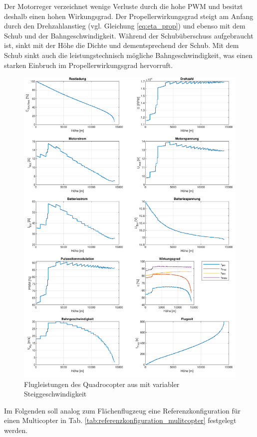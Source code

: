 Der Motorreger verzeichnet wenige Verluste durch die hohe PWM und besitzt deshalb einen hohen Wirkungsgrad. Der Propellerwirkungsgrad steigt am Anfang durch den Drehzahlanstieg (vgl. Gleichung \ref{eq:eta_prop}) und ebenso mit dem Schub und der Bahngeschwindigkeit. Während der Schubüberschuss aufgebraucht ist, sinkt mit der Höhe die Dichte und dementsprechend der Schub. Mit dem Schub sinkt auch die leistungstechnisch mögliche Bahngeschwindigkeit, was einen starken Einbruch im Propellerwirkungsgrad hervorruft.

\begin{figure}[H]
\centering
	\includegraphics[scale=0.7]{Diagramme/Russland_vvar.pdf}
	\caption{Flugleistungen des Quadrocopter aus \cite{Anderson.2018} mit variabler Steiggeschwindigkeit}
	\label{abb:fp}
\end{figure}

Im Folgenden soll analog zum Flächenflugzeug eine Referenzkonfiguration für einen Multicopter in Tab. \ref{tab:referenzkonfiguration_mulitcopter} festgelegt werden.

